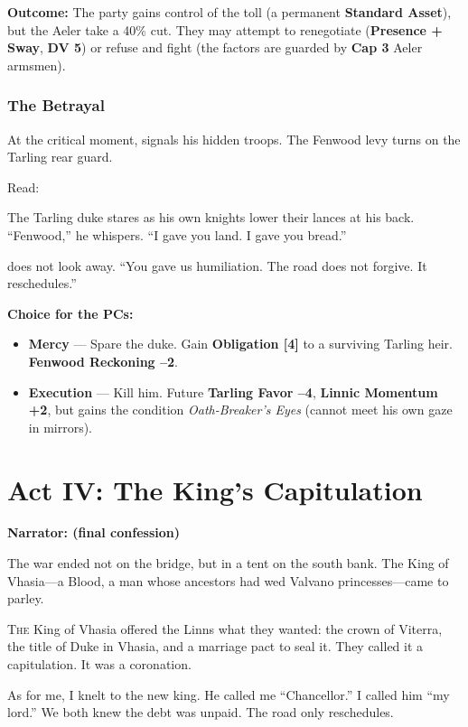 \documentclass[11pt,a5paper]{book}
\newcommand{\dv}[1]{\textbf{DV #1}}
\newcommand{\clock}[1]{\textbf{[#1]}}
\newcommand{\condition}[1]{\textit{#1}}
\begin{document}
\textbf{Outcome:} The party gains control of the toll (a permanent \textbf{Standard Asset}), but the Aeler take a 40\% cut. They may attempt to renegotiate (\textbf{Presence + Sway}, \dv{5}) or refuse and fight (the factors are guarded by \textbf{Cap 3} Aeler armsmen).

\subsection*{The Betrayal}

At the critical moment, \aldric{} signals his hidden troops. The Fenwood levy turns on the Tarling rear guard.

Read:
\begin{quoting}
The Tarling duke stares as his own knights lower their lances at his back. ``Fenwood,'' he whispers. ``I gave you land. I gave you bread.''

\aldric{} does not look away. ``You gave us humiliation. The road does not forgive. It reschedules.''
\end{quoting}

\textbf{Choice for the PCs:}
\begin{itemize}[leftmargin=*]
\item \textbf{Mercy} --- Spare the duke. Gain \textbf{Obligation \clock{4}} to a surviving Tarling heir. \textbf{Fenwood Reckoning --2}.
\item \textbf{Execution} --- Kill him. Future \textbf{Tarling Favor --4}, \textbf{Linnic Momentum +2}, but \aldric{} gains the condition \condition{Oath-Breaker's Eyes} (cannot meet his own gaze in mirrors).
\end{itemize}

\clearpage

\chapter{Act IV: The King's Capitulation}
\textbf{Narrator: \aldric{} (final confession)}

\epigraph{The war ended not on the bridge, but in a tent on the south bank. The King of Vhasia---a Blood, a man whose ancestors had wed Valvano princesses---came to parley.}{\aldric}

\lettrine{T}{he} King of Vhasia offered the Linns what they wanted: the crown of Viterra, the title of Duke in Vhasia, and a marriage pact to seal it. They called it a capitulation. It was a coronation.

As for me, I knelt to the new king. He called me ``Chancellor.'' I called him ``my lord.'' We both knew the debt was unpaid. The road only reschedules.
\end{document}
